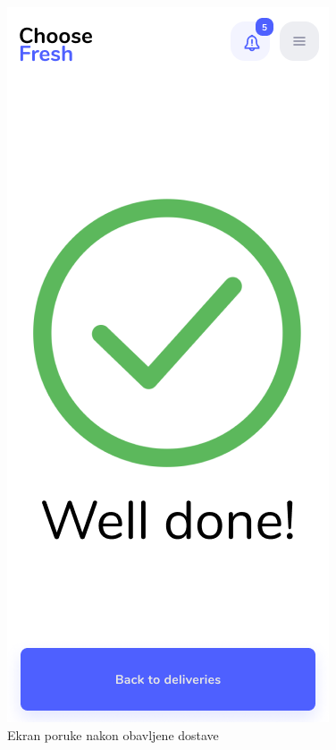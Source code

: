 \begin{figure}[H]
	\begin{center}
		\includegraphics[scale=0.3]{UI/deliveryman_done_delivery.png}
    		\caption{Ekran poruke nakon obavljene dostave}
    \label{fig:DeliverymanDone}
    \end{center}
\end{figure}

